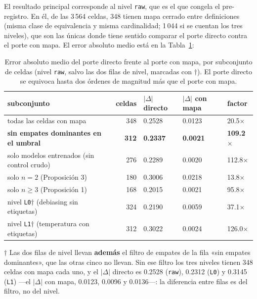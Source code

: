 El resultado principal corresponde al nivel \texttt{raw}, que es el que congela el pre-registro. En él, de las
3\,564 celdas, 348 tienen mapa cerrado entre definiciones (misma clase de equivalencia y misma cardinalidad;
1\,044 si se cuentan los tres niveles), que son las únicas donde tiene sentido comparar el porte directo
contra el porte con mapa. El error absoluto medio está en la Tabla~\ref{tab:error-transferencia}:

\begin{table}[t]
\centering
\caption{Error absoluto medio del porte directo frente al porte con mapa, por subconjunto de celdas (nivel
\texttt{raw}, salvo las dos filas de nivel, marcadas con $\dagger$). El porte directo se equivoca hasta dos
órdenes de magnitud más que el porte con mapa.}
\label{tab:error-transferencia}
{\footnotesize
\setlength{\tabcolsep}{3pt}
\begin{tabular}{p{}rlll}
\toprule
subconjunto & celdas & $\lvert\Delta\rvert$ directo & $\lvert\Delta\rvert$ con mapa & factor \\
\midrule
todas las celdas con mapa & 348 & 0.2528 & 0.0123 & 20.5$\times$ \\
\textbf{sin empates dominantes en el umbral} & \textbf{312} & \textbf{0.2337} & \textbf{0.0021} & \textbf{109.2$\times$} \\
solo modelos entrenados (sin control crudo) & 276 & 0.2289 & 0.0020 & 112.8$\times$ \\
solo $n = 2$ (Proposición 3) & 180 & 0.3006 & 0.0218 & 13.8$\times$ \\
solo $n \ge 3$ (Proposición 1) & 168 & 0.2015 & 0.0021 & 95.8$\times$ \\
nivel \texttt{L0}$\dagger$ (debiasing sin etiquetas) & 324 & 0.2190 & 0.0059 & 37.1$\times$ \\
nivel \texttt{L1}$\dagger$ (temperatura con etiquetas) & 312 & 0.3022 & 0.0024 & 126.0$\times$ \\
\bottomrule
\end{tabular}}
\par\vspace{2pt}
{\footnotesize$\dagger$ Las dos filas de nivel llevan \textbf{además} el filtro de empates de la fila «sin
empates dominantes», que las otras cinco no llevan. Sin ese filtro los tres niveles tienen 348 celdas con mapa
cada uno, y el $\lvert\Delta\rvert$ directo es 0.2528 (\texttt{raw}), 0.2312 (\texttt{L0}) y 0.3145
(\texttt{L1}) ---el $\lvert\Delta\rvert$ con mapa, 0.0123, 0.0096 y 0.0136---: la diferencia entre filas es del
filtro, no del nivel.}
\end{table}

